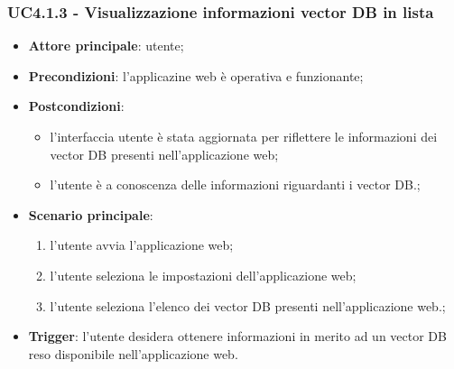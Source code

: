\documentclass[10pt, a4paper]{article}
\begin{document}
    \subsubsection{UC4.1.3 - Visualizzazione informazioni vector DB in lista}
    \begin{itemize}
        \item \textbf{Attore principale}: utente;
        \item \textbf{Precondizioni}: l'applicazine web è operativa e funzionante;
        \item \textbf{Postcondizioni}: 
        \begin{itemize}
            \item l'interfaccia utente è stata aggiornata per riflettere le informazioni dei vector DB presenti nell'applicazione web;
            \item l'utente è a conoscenza delle informazioni riguardanti i vector DB.; 
        \end{itemize}
        \item \textbf{Scenario principale}:
            \begin{enumerate}
                \item l'utente avvia l'applicazione web;
                \item l'utente seleziona le impostazioni dell'applicazione web;
                \item l'utente seleziona l'elenco dei vector DB presenti nell'applicazione web.;
            \end{enumerate}
        \item \textbf{Trigger}: l'utente desidera ottenere informazioni in merito ad un vector DB reso disponibile nell'applicazione web.
    \end{itemize}
\end{document}
